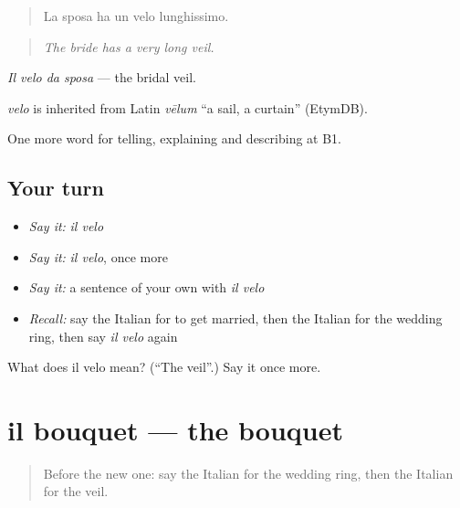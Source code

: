 \begin{quote}
La sposa ha un velo lunghissimo.
\end{quote}

\begin{quote}
\emph{The bride has a very long veil.}
\end{quote}

\emph{Il velo da sposa} — the bridal veil.

\begin{cousinweb}
\emph{velo} is inherited from Latin \emph{vēlum} \textquotedblleft{}a sail, a curtain\textquotedblright{} (EtymDB).
\end{cousinweb}

\begin{grammarlens}[title={What you've built}]
One more word for telling, explaining and describing at B1.
\end{grammarlens}

\subsection*{Your turn}
\begin{itemize}
\raggedright
  \item \emph{Say it:} \emph{il velo}
  \item \emph{Say it:} \emph{il velo}, once more
  \item \emph{Say it:} a sentence of your own with \emph{il velo}
  \item \emph{Recall:} say the Italian for to get married, then the Italian for the wedding ring, then say \emph{il velo} again
\end{itemize}

\begin{tcolorbox}[breakable,colback=teal!4,colframe=teal!35!black,title={Before you move on}]
What does il velo mean? (\textquotedblleft{}The veil\textquotedblright{}.) Say it once more.
\end{tcolorbox}
\section[il bouquet]{il bouquet — the bouquet}

\label{lesson:IT-C311-bouquet}



\begin{quote}
Before the new one: say the Italian for the wedding ring, then the Italian for the veil.
\end{quote}

